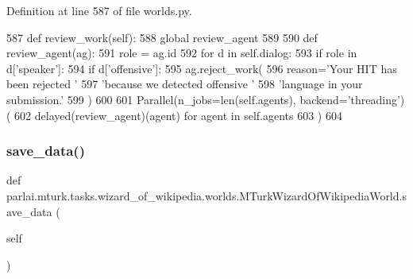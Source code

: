 Definition at line 587 of file worlds.\+py.


\begin{DoxyCode}
587     \textcolor{keyword}{def }review\_work(self):
588         \textcolor{keyword}{global} review\_agent
589 
590         \textcolor{keyword}{def }review\_agent(ag):
591             role = ag.id
592             \textcolor{keywordflow}{for} d \textcolor{keywordflow}{in} self.dialog:
593                 \textcolor{keywordflow}{if} role \textcolor{keywordflow}{in} d[\textcolor{stringliteral}{'speaker'}]:
594                     \textcolor{keywordflow}{if} d[\textcolor{stringliteral}{'offensive'}]:
595                         ag.reject\_work(
596                             reason=\textcolor{stringliteral}{'Your HIT has been rejected '}
597                             \textcolor{stringliteral}{'because we detected offensive '}
598                             \textcolor{stringliteral}{'language in your submission.'}
599                         )
600 
601         Parallel(n\_jobs=len(self.agents), backend=\textcolor{stringliteral}{'threading'})(
602             delayed(review\_agent)(agent) \textcolor{keywordflow}{for} agent \textcolor{keywordflow}{in} self.agents
603         )
604 
\end{DoxyCode}
\mbox{\label{classparlai_1_1mturk_1_1tasks_1_1wizard__of__wikipedia_1_1worlds_1_1MTurkWizardOfWikipediaWorld_a2cc512e7aab47494715260bebda33ca8}} 
\subsubsection{\texorpdfstring{save\+\_\+data()}{save\_data()}}
{\footnotesize\ttfamily def parlai.\+mturk.\+tasks.\+wizard\+\_\+of\+\_\+wikipedia.\+worlds.\+M\+Turk\+Wizard\+Of\+Wikipedia\+World.\+save\+\_\+data (\begin{DoxyParamCaption}\item[{}]{self }\end{DoxyParamCaption})}




